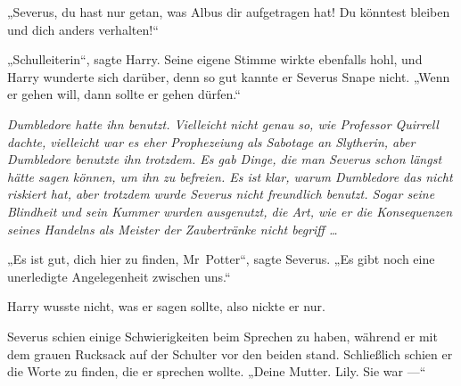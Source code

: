 „Severus, du hast nur getan, was Albus dir aufgetragen hat! Du könntest bleiben und dich anders verhalten!“

„Schulleiterin“, sagte Harry. Seine eigene Stimme wirkte ebenfalls hohl, und Harry wunderte sich darüber, denn so gut kannte er Severus Snape nicht.
„Wenn er gehen will, dann sollte er gehen dürfen.“

\emph{Dumbledore hatte ihn benutzt. Vielleicht nicht genau so, wie Professor Quirrell dachte, vielleicht war es eher Prophezeiung als Sabotage an Slytherin, aber Dumbledore benutzte ihn trotzdem. Es gab Dinge, die man Severus schon längst hätte sagen können, um ihn zu befreien. Es ist klar, warum Dumbledore das nicht riskiert hat, aber trotzdem wurde Severus nicht freundlich benutzt. Sogar seine Blindheit und sein Kummer wurden ausgenutzt, die Art, wie er die Konsequenzen seines Handelns als Meister der Zaubertränke nicht begriff …}

„Es ist gut, dich hier zu finden, Mr~Potter“, sagte Severus.
„Es gibt noch eine unerledigte Angelegenheit zwischen uns.“

Harry wusste nicht, was er sagen sollte, also nickte er nur.

Severus schien einige Schwierigkeiten beim Sprechen zu haben, während er mit dem grauen Rucksack auf der Schulter vor den beiden stand. Schließlich schien er die Worte zu finden, die er sprechen wollte.
„Deine Mutter. Lily. Sie war —“

